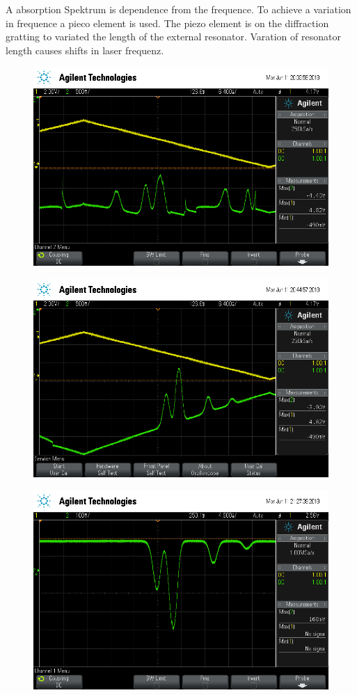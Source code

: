 A absorption Spektrum is dependence from the frequence. 
To achieve a variation in frequence a pieco element is used. 
The piezo element is on the diffraction gratting to variated the length of the
external resonator. 
Varation of resonator length causes shifts in laser frequenz. 
\begin{figure}[h]
		\centering
		\includegraphics[width=0.8\linewidth]{./content/pictures/scope_136.png}
		\caption{}
		\label{fig:}
\end{figure}

\begin{figure}[h]
		\centering
		\includegraphics[width=0.8\linewidth]{./content/pictures/scope_139.png}
		\caption{}
		\label{fig:}
\end{figure}

\begin{figure}[ht]
		\centering
		\includegraphics[width=0.8\linewidth]{./content/pictures/scope_140.png}
		\caption{}
		\label{fig:name}
\end{figure}
